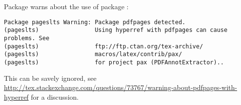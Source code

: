 Package  warns about the use of package :
%
\begin{verbatim}
Package pageslts Warning: Package pdfpages detected.
(pageslts)                Using hyperref with pdfpages can cause problems. See
(pageslts)                ftp://ftp.ctan.org/tex-archive/
(pageslts)                macros/latex/contrib/pax/
(pageslts)                for project pax (PDFAnnotExtractor)..
\end{verbatim}
%
This can be savely ignored, see \url{http://tex.stackexchange.com/questions/73767/warning-about-pdfpages-with-hyperref} for a discussion.

